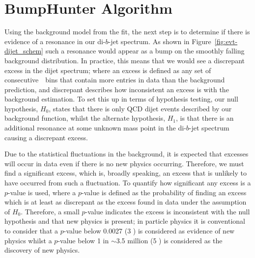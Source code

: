 
\section{BumpHunter Algorithm}
\label{sec:bkg-bh}

Using the  background model from the fit, the next step is to determine if there is evidence of a resonance in our di-$b$-jet spectrum.
As shown in Figure~\ref{fig:evt-dijet_schem} such a resonance would appear as a bump on the smoothly falling background distribution.
In practice, this means that we would see a discrepant excess in the dijet spectrum;
where an excess is defined as any set of consecutive~\mjj~bins that contain more entries in data than the background prediction,
and discrepant describes how inconsistent an excess is with the background estimation.
To set this up in terms of hypothesis testing,
our null hypothesis, $H_0$, states that there is only QCD dijet events described by our background function,
whilst the alternate hypothesis, $H_1$, is that there is an additional resonance at some
unknown mass point in the di-$b$-jet spectrum causing a discrepant excess.

Due to the statistical fluctuations in the background,
it is expected that excesses will occur in data even if there is no new physics occurring.
Therefore, we must find a significant excess, which is, broadly speaking, an excess that is unlikely to have occurred from such a fluctuation.
To quantify how significant any excess is a $p$-value is used,
where a $p$-value is defined as the probability of finding an excess which is at least as discrepant as the excess found in data
under the assumption of $H_0$.
Therefore, a small $p$-value indicates the excess is inconsistent with the null hypothesis and that new physics is present;
in particle physics it is conventional to consider that a $p$-value below 0.0027 (3 \sigma) is considered as evidence of new physics
whilst a $p$-value below 1 in $\sim$3.5 million (5 \sigma) is considered as the discovery of new physics.

